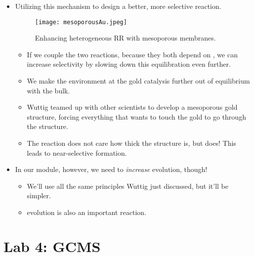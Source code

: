 \documentclass[../notes.tex]{subfiles}
\begin{document}
\begin{itemize}
    \item Utilizing this mechanism to design a better, more selective reaction.
    \begin{figure}[H]
        \centering
        \texttt{[image: mesoporousAu.jpeg]}
        \caption{Enhancing heterogeneous RR with mesoporous membranes.}
        \label{fig:mesoporousAu}
    \end{figure}
    \begin{itemize}
        \item If we couple the two reactions, because they both depend on , we can increase selectivity by slowing down this equilibration even further.
        \item We make the environment at the gold catalysis further out of equilibrium with the bulk.
        \item Wuttig teamed up with other scientists to develop a mesoporous gold structure, forcing everything that wants to touch the gold to go through the structure.
        \item The  reaction does not care how thick the structure is, but  does! This leads to near-selective  formation.
    \end{itemize}
    \item In our module, however, we need to \emph{increase}  evolution, though!
    \begin{itemize}
        \item We'll use all the same principles Wuttig just discussed, but it'll be simpler.
        \item {} evolution is also an important reaction.
    \end{itemize}
\end{itemize}



\section{Lab 4: GCMS}
\end{document}
